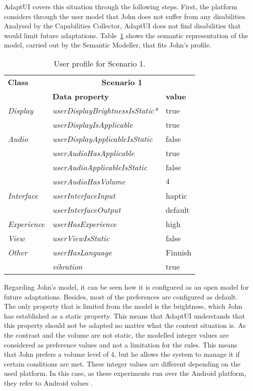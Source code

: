 AdaptUI covers this situation through the following steps. First, the platform
considers through the user model that John does not suffer from any 
disabilities. Analysed by the Capabilities Collector, AdaptUI does not find 
disabilities that would limit future adaptations. 
Table~\ref{tbl:user_profile_scenario1} shows the semantic representation of the 
model, carried out by the Semantic Modeller, that fits John’s profile. 

\begin{table}
 \caption{User profile for Scenario 1.}
 \label{tbl:user_profile_scenario1}
 \footnotesize
 \centering
\begin{tabular}{l l l }
  \hline 
  \textbf{Class}  & \multicolumn{2}{c}{\textbf{Scenario 1}}		\\
		  & \textbf{Data property} & \textbf{value} 		\\
  \hline
  \textit{Display}& \textit{userDisplayBrightnessIsStatic*} & true	\\
		  & \textit{userDisplayIsApplicable}	    & true	\\
  \textit{Audio}  & \textit{userDisplayApplicableIsStatic}  & false	\\
		  & \textit{userAudioHasApplicable} 	    & true 	\\
		  & \textit{userAudioApplicableIsStatic}    & false 	\\
		  & \textit{userAudioHasVolume}  	    & $4$ 	\\
  \textit{Interface}& \textit{userInterfaceInput}	    & haptic	\\
		  & \textit{userInterfaceOutput} 	    & default	\\
  \textit{Experience}& \textit{userHasExperience} 	    & high	\\
  \textit{View}	  & \textit{userViewIsStatic}		    & false	\\
  \textit{Other}  & \textit{userHasLanguage}		    & Finnish	\\
		  & \textit{vibration} 			    & true 	\\
  \hline
\end{tabular}
\end{table}

Regarding John’s model, it can be seen how it is configured as an open model for
future adaptations. Besides, most of the preferences are configured as default. 
The only property that is limited from the model is the brightness, which John
has established as a static property. This means that AdaptUI understands that
this property should not be adapted no matter what the context situation is.
As the contrast and the volume are not static, the modelled integer values are
considered as preference values and not a limitation for the rules. This means
that John prefers a volume level of 4, but he allows the system to manage it if
certain conditions are met. These integer values are different depending on the
used platform. In this case, as these experiments run over the Android platform,
they refer to Android values \citep{android_volume}. 


